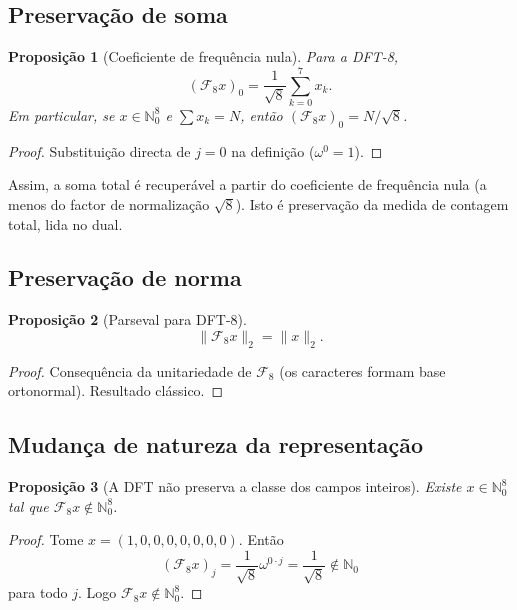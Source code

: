 \documentclass[11pt,a4paper]{article}
\newtheorem{proposicao}{Proposição}
\begin{document}
\subsection{Preservação de soma}

\begin{proposicao}[Coeficiente de frequência nula]
Para a DFT-8,
\[
(\mathcal F_8 x)_0=\frac1{\sqrt8}\sum_{k=0}^{7}x_k.
\]
Em particular, se \(x\in\mathbb N_0^8\) e \(\sum x_k=N\), então \((\mathcal F_8 x)_0=N/\sqrt8\).
\end{proposicao}

\begin{proof}
Substituição directa de \(j=0\) na definição (\(\omega^{0}=1\)).
\end{proof}

Assim, a soma total é recuperável a partir do coeficiente de frequência nula (a menos do factor de normalização \(\sqrt8\)). Isto é preservação da medida de contagem total, lida no dual.

\subsection{Preservação de norma}

\begin{proposicao}[Parseval para DFT-8]
\[
\lVert\mathcal F_8 x\rVert_2=\lVert x\rVert_2.
\]
\end{proposicao}

\begin{proof}
Consequência da unitariedade de \(\mathcal F_8\) (os caracteres formam base ortonormal). Resultado clássico.
\end{proof}

\subsection{Mudança de natureza da representação}

\begin{proposicao}[A DFT não preserva a classe dos campos inteiros]
\label{prop:nao-inteiro}
Existe \(x\in\mathbb N_0^8\) tal que \(\mathcal F_8 x\notin\mathbb N_0^8\).
\end{proposicao}

\begin{proof}
Tome \(x=(1,0,0,0,0,0,0,0)\). Então
\[
(\mathcal F_8 x)_j=\frac1{\sqrt8}\omega^{0\cdot j}=\frac1{\sqrt8}\notin\mathbb N_0
\]
para todo \(j\). Logo \(\mathcal F_8 x\notin\mathbb N_0^8\).
\end{proof}
\end{document}
